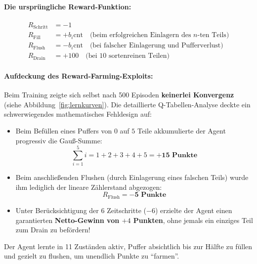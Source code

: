 \documentclass[11pt,a4paper]{article}
\begin{document}
\paragraph{Die ursprüngliche Reward-Funktion:}
\begin{align}
  R_{\text{Schritt}} &= -1 \\
  R_{\text{Fill}} &= +b_i\text{cnt} \quad \text{(beim erfolgreichen Einlagern des $n$-ten Teils)} \\
  R_{\text{Flush}} &= -b_i\text{cnt} \quad \text{(bei falscher Einlagerung und Pufferverlust)} \\
  R_{\text{Drain}} &= +100 \quad \text{(bei 10 sortenreinen Teilen)}
\end{align}

\paragraph{Aufdeckung des Reward-Farming-Exploits:}
Beim Training zeigte sich selbst nach 500 Episoden \textbf{keinerlei Konvergenz} (siehe Abbildung~\ref{fig:lernkurven}). Die detaillierte Q-Tabellen-Analyse deckte ein schwerwiegendes mathematisches Fehldesign auf:
\begin{itemize}
  \item Beim Befüllen eines Puffers von $0$ auf $5$ Teile akkumulierte der Agent progressiv die Gauß-Summe:
  \[
    \sum_{i=1}^{5} i = 1 + 2 + 3 + 4 + 5 = \mathbf{+15 \text{ Punkte}}
  \]
  \item Beim anschließenden Flushen (durch Einlagerung eines falschen Teils) wurde ihm lediglich der lineare Zählerstand abgezogen:
  \[
    R_{\text{Flush}} = \mathbf{-5 \text{ Punkte}}
  \]
  \item Unter Berücksichtigung der $6$ Zeitschritte ($-6$) erzielte der Agent einen garantierten \textbf{Netto-Gewinn von $+4$ Punkten}, ohne jemals ein einziges Teil zum Drain zu befördern!
\end{itemize}
Der Agent lernte in 11 Zuständen aktiv, Puffer absichtlich bis zur Hälfte zu füllen und gezielt zu flushen, um unendlich Punkte zu \enquote{farmen}.

\end{document}
